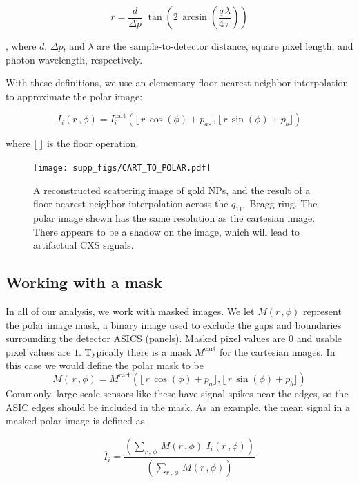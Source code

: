 \documentclass [12pt,fleqn]{article}
\def \be {\begin{equation}}
\def \ee {\end{equation}}
\begin{document}
\be
r = \frac{d}{\Delta p}\,\,\tan\left(2\,\arcsin \left( \frac{q\,\lambda}{4\,\pi}  \right) \right)
\ee

, where $d$, $\Delta p$, and $\lambda$ are the sample-to-detector distance, square pixel length, and photon wavelength, respectively.

With these definitions, we use an elementary floor-nearest-neighbor interpolation to approximate the polar image:

\begin{equation} \label{polimg}
I_i(r \,, \phi) = I_i ^{ \mathrm{cart} }\left ( \lfloor\,  r \,\cos(\phi)+p_a \rfloor, \lfloor\, r\, \sin(\phi) +p_b \rfloor \right)
\end{equation}

where $\lfloor\,\rfloor$ is the floor operation.

\begin{figure}[H]
\texttt{[image: supp\_figs/CART\_TO\_POLAR.pdf]}
\caption{A reconstructed scattering image of gold NPs, and the result of a floor-nearest-neighbor interpolation across the $q_{111}$ Bragg ring. The polar image shown has the same resolution as the cartesian image. There appears to be a shadow on the image, which will lead to artifactual CXS signals.}
\label{supp:cart2pol}
\end{figure}

\subsection{Working with a mask}
In all of our analysis, we work with masked images. We let $M(r\,,\phi)$ represent the polar image mask, a binary image used to exclude the gaps and boundaries surrounding the detector ASICS (panels). Masked pixel values are $0$ and usable pixel values are $1$. Typically there is a mask $M^{\text{cart}}$ for the cartesian images. In this case we would define the polar mask to be $$M(\,r\,, \phi) = M^{\text{cart}} \left ( \lfloor\, r\,\cos(\phi)+p_a \rfloor, \lfloor\,r\, \sin(\phi) +p_b \rfloor \right)$$
Commonly, large scale sensors like these have signal spikes near the edges, so the ASIC edges should be included in the mask. As an example, the mean signal in a masked polar image is defined as

\begin{equation} \label{average_signal}
\overline I_i =  \frac
{\left(\sum\limits_{r\,,\,\phi}\, M( r\,,\phi )\,\,I_i(r\,,\phi) \right) }
 {\left (\sum\limits_{r\,,\,\phi}\, M ( r\,,\phi )\right )}
\end{equation}
\end{document}
